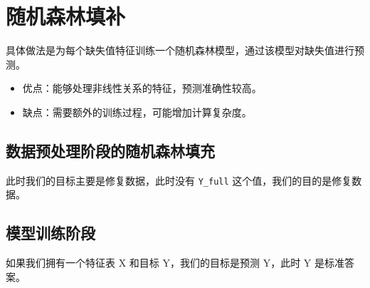 \section{随机森林填补}

\begin{definition}[随机森林插值]
    具体做法是为每个缺失值特征训练一个随机森林模型，通过该模型对缺失值进行预测。
\end{definition}

\begin{tips}
    \begin{itemize}
        \item 优点：能够处理非线性关系的特征，预测准确性较高。
        \item 缺点：需要额外的训练过程，可能增加计算复杂度。
    \end{itemize}
\end{tips}

\subsection{数据预处理阶段的随机森林填充}

此时我们的目标主要是修复数据，此时没有 \texttt{Y\_full} 这个值，我们的目的是修复数据。

\subsection{模型训练阶段}

如果我们拥有一个特征表 X 和目标 Y，我们的目标是预测 Y，此时 Y 是标准答案。
